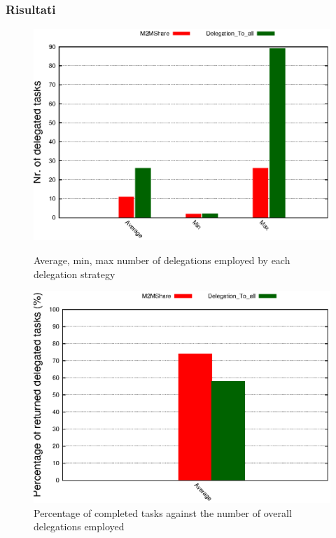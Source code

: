 \documentclass{beamer}
\begin{document}
\begin{frame}
\frametitle{Risultati}
\begin{figure}[ht]
\begin{minipage}[b]{0.45\linewidth}
\centering
\includegraphics[scale=0.4]{delegheFatte.eps}
\caption{Average, min, max number of delegations employed by each delegation strategy}
\end{minipage}
\hspace{0.5cm}
\begin{minipage}[b]{0.45\linewidth}
\centering
\includegraphics[scale=0.4]{percDeleghe.eps}
\caption{Percentage of completed tasks against the number of overall delegations employed}
\end{minipage}
\end{figure}
\end{frame}
\end{document}
